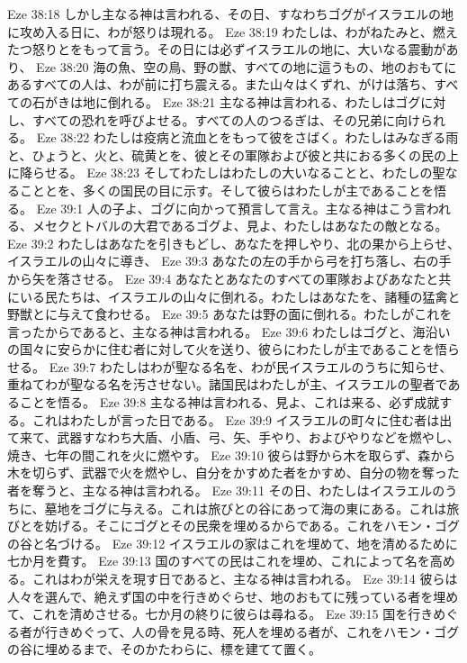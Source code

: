 Eze 38:18  しかし主なる神は言われる、その日、すなわちゴグがイスラエルの地に攻め入る日に、わが怒りは現れる。
Eze 38:19  わたしは、わがねたみと、燃えたつ怒りとをもって言う。その日には必ずイスラエルの地に、大いなる震動があり、
Eze 38:20  海の魚、空の鳥、野の獣、すべての地に這うもの、地のおもてにあるすべての人は、わが前に打ち震える。また山々はくずれ、がけは落ち、すべての石がきは地に倒れる。
Eze 38:21  主なる神は言われる、わたしはゴグに対し、すべての恐れを呼びよせる。すべての人のつるぎは、その兄弟に向けられる。
Eze 38:22  わたしは疫病と流血とをもって彼をさばく。わたしはみなぎる雨と、ひょうと、火と、硫黄とを、彼とその軍隊および彼と共におる多くの民の上に降らせる。
Eze 38:23  そしてわたしはわたしの大いなることと、わたしの聖なることとを、多くの国民の目に示す。そして彼らはわたしが主であることを悟る。
Eze 39:1  人の子よ、ゴグに向かって預言して言え。主なる神はこう言われる、メセクとトバルの大君であるゴグよ、見よ、わたしはあなたの敵となる。
Eze 39:2  わたしはあなたを引きもどし、あなたを押しやり、北の果から上らせ、イスラエルの山々に導き、
Eze 39:3  あなたの左の手から弓を打ち落し、右の手から矢を落させる。
Eze 39:4  あなたとあなたのすべての軍隊およびあなたと共にいる民たちは、イスラエルの山々に倒れる。わたしはあなたを、諸種の猛禽と野獣とに与えて食わせる。
Eze 39:5  あなたは野の面に倒れる。わたしがこれを言ったからであると、主なる神は言われる。
Eze 39:6  わたしはゴグと、海沿いの国々に安らかに住む者に対して火を送り、彼らにわたしが主であることを悟らせる。
Eze 39:7  わたしはわが聖なる名を、わが民イスラエルのうちに知らせ、重ねてわが聖なる名を汚させない。諸国民はわたしが主、イスラエルの聖者であることを悟る。
Eze 39:8  主なる神は言われる、見よ、これは来る、必ず成就する。これはわたしが言った日である。
Eze 39:9  イスラエルの町々に住む者は出て来て、武器すなわち大盾、小盾、弓、矢、手やり、およびやりなどを燃やし、焼き、七年の間これを火に燃やす。
Eze 39:10  彼らは野から木を取らず、森から木を切らず、武器で火を燃やし、自分をかすめた者をかすめ、自分の物を奪った者を奪うと、主なる神は言われる。
Eze 39:11  その日、わたしはイスラエルのうちに、墓地をゴグに与える。これは旅びとの谷にあって海の東にある。これは旅びとを妨げる。そこにゴグとその民衆を埋めるからである。これをハモン・ゴグの谷と名づける。
Eze 39:12  イスラエルの家はこれを埋めて、地を清めるために七か月を費す。
Eze 39:13  国のすべての民はこれを埋め、これによって名を高める。これはわが栄えを現す日であると、主なる神は言われる。
Eze 39:14  彼らは人々を選んで、絶えず国の中を行きめぐらせ、地のおもてに残っている者を埋めて、これを清めさせる。七か月の終りに彼らは尋ねる。
Eze 39:15  国を行きめぐる者が行きめぐって、人の骨を見る時、死人を埋める者が、これをハモン・ゴグの谷に埋めるまで、そのかたわらに、標を建てて置く。
